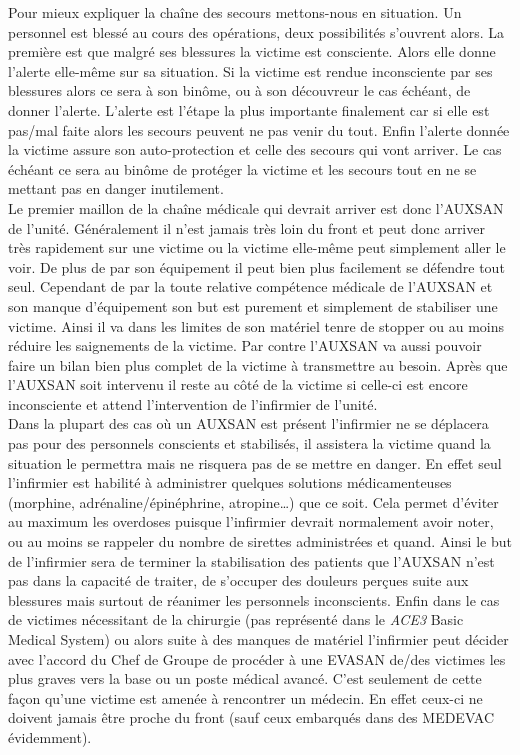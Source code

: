 \documentclass{article}
\newcommand{\medsys}{\emph{ACE3} Basic Medical System}
\begin{document}
		Pour mieux expliquer la chaîne des secours mettons-nous en situation. Un personnel est blessé au cours des opérations, deux possibilités s'ouvrent alors. La première est que malgré ses blessures la victime est consciente. Alors elle donne l'alerte elle-même sur sa situation. Si la victime est rendue inconsciente par ses blessures alors ce sera à son binôme, ou à son découvreur le cas échéant, de donner l'alerte. L'alerte est l'étape la plus importante finalement car si elle est pas/mal faite alors les secours peuvent ne pas venir du tout. Enfin l'alerte donnée la victime assure son auto-protection et celle des secours qui vont arriver. Le cas échéant ce sera au binôme de protéger la victime et les secours tout en ne se mettant pas en danger inutilement.\\
		
		Le premier maillon de la chaîne médicale qui devrait arriver est donc l'AUXSAN de l'unité. Généralement il n'est jamais très loin du front et peut donc arriver très rapidement sur une victime ou la victime elle-même peut simplement aller le voir. De plus de par son équipement il peut bien plus facilement se défendre tout seul. Cependant de par la toute relative compétence médicale de l'AUXSAN et son manque d'équipement son but est purement et simplement de stabiliser une victime. Ainsi il va dans les limites de son matériel tenre de stopper ou au moins réduire les saignements de la victime. Par contre l'AUXSAN va aussi pouvoir faire un bilan bien plus complet de la victime à transmettre au besoin. Après que l'AUXSAN soit intervenu il reste au côté de la victime si celle-ci est encore inconsciente et attend l'intervention de l'infirmier de l'unité. \\
		
		Dans la plupart des cas où un AUXSAN est présent l'infirmier ne se déplacera pas pour des personnels conscients et stabilisés, il assistera la victime quand la situation le permettra mais ne risquera pas de se mettre en danger. En effet seul l'infirmier est habilité à administrer quelques solutions médicamenteuses (morphine, adrénaline/épinéphrine, atropine\dots) que ce soit. Cela permet d'éviter au maximum les overdoses puisque l'infirmier devrait normalement avoir noter, ou au moins se rappeler du nombre de sirettes administrées et quand. Ainsi le but de l'infirmier sera de terminer la stabilisation des patients que l'AUXSAN n'est pas dans la capacité de traiter, de s'occuper des douleurs perçues suite aux blessures mais surtout de réanimer les personnels inconscients. Enfin dans le cas de victimes nécessitant de la chirurgie (pas représenté dans le \medsys) ou alors suite à des manques de matériel l'infirmier peut décider avec l'accord du Chef de Groupe de procéder à une EVASAN de/des victimes les plus graves vers la base ou un poste médical avancé. C'est seulement de cette façon qu'une victime est amenée à rencontrer un médecin. En effet ceux-ci ne doivent jamais être proche du front (sauf ceux embarqués dans des MEDEVAC évidemment).\\
		
\end{document}
